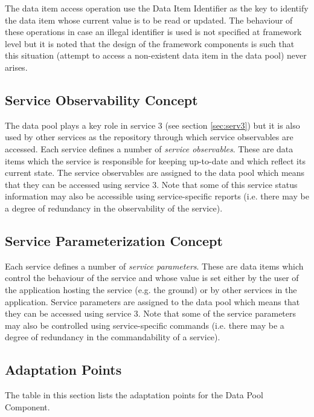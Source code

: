 \documentclass[a4paper,10pt]{article}
\begin{document}
The data item access operation use the Data Item Identifier as the key to identify the data item whose current value is to be read or updated. The behaviour of these operations in case an illegal identifier is used is not specified at framework level but it is noted that the design of the framework components is such that this situation (attempt to access a non-existent data item in the data pool) never arises. 

\subsection{Service Observability Concept}\label{sec:servObsConcept}
The data pool plays a key role in service 3 (see section \ref{sec:serv3}) but it is also used by other services as the repository through which service observables are accessed. Each service defines a number of \textit{service observables}. These are data items which the service is responsible for keeping up-to-date and which reflect its current state. The service observables are assigned to the data pool which means that they can be accessed using service 3. Note that some of this service status information may also be accessible using service-specific reports (i.e. there may be a degree of redundancy in the observability of the service). 

\subsection{Service Parameterization Concept}\label{sec:servParConcept}
Each service defines a number of \textit{service parameters}. These are data items which control the behaviour of the service and whose value is set either by the user of the application hosting the service (e.g. the ground) or by other services in the application. Service parameters are assigned to the data pool which means that they can be accessed using service 3. Note that some of the service parameters may also be controlled using service-specific commands (i.e. there may be a degree of redundancy in the commandability of a service).


\subsection{Adaptation Points}
The table in this section lists the adaptation points for the Data Pool Component.
\end{document}
